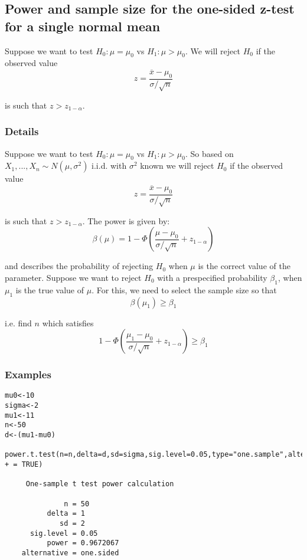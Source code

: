 \documentclass[12pt,a4paper]{article}
\theoremstyle{regla}
\theoremstyle{remark}
\theoremstyle{definition}
\theoremstyle{nonumberbreak}
\begin{document}
\subsection{Power and sample size for the one-sided z-test for a single normal mean}
\begin{fbox}
\begin{minipage}{0.97\textwidth}
Suppose we want to test $H_0:\mu=\mu_0$ vs $H_1:\mu>\mu_0$. We will reject $H_0$ if the observed value $$z=\frac{\overline{x}-\mu_0}{\sigma/\sqrt{n}}$$

is such that $z>z_{1-\alpha}$. 

\end{minipage}
\end{fbox}
\subsubsection{Details}
Suppose we want to test $H_0:\mu=\mu_0$ vs $H_1:\mu>\mu_0$. So based on $X_1,...,X_n\sim N(\mu,\sigma ^2)$ i.i.d. with $\sigma^2$ known we will reject $H_0$ if the observed value $$z=\frac{\overline{x}-\mu_0}{\sigma/\sqrt{n}}$$

is such that $z>z_{1-\alpha}$. The power is given by: $$\beta(\mu)=1-\Phi(\frac{\mu-\mu_0}{\sigma/\sqrt{n}}+z_{1-\alpha})$$

and describes the probability of rejecting $H_0$ when $\mu$ is the correct value of the parameter. Suppose we want to reject $H_0$ with a prespecified probability $\beta_1$, when $\mu_1$ is the true value of $\mu$. For this, we need to select the sample size so that 
$$\beta(\mu_1) \geq \beta_1$$

i.e. find $n$ which satisfies
$$1-\Phi(\frac{\mu_1-\mu_0}{\sigma/\sqrt{n}}+z_{1-\alpha})\geq \beta_1$$

\subsubsection{Examples}
\begin{xmpl}
\begin{lstlisting}
mu0<-10
sigma<-2
mu1<-11
n<-50
d<-(mu1-mu0)

power.t.test(n=n,delta=d,sd=sigma,sig.level=0.05,type="one.sample",alternative="one.sided",strict
+ = TRUE)

     One-sample t test power calculation 

              n = 50
          delta = 1
             sd = 2
      sig.level = 0.05
          power = 0.9672067
    alternative = one.sided
\end{lstlisting}
\end{xmpl}
\end{document}
